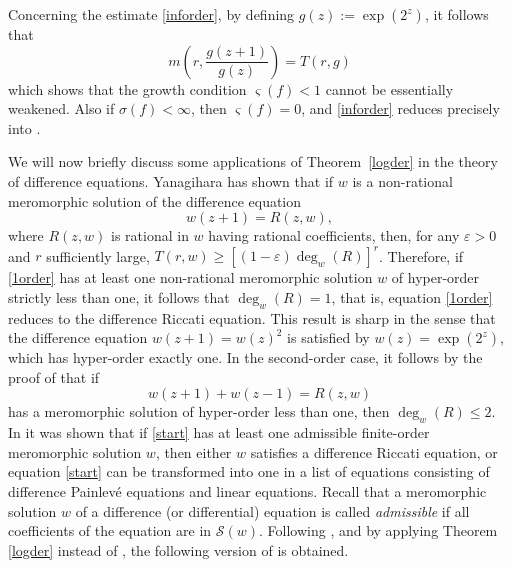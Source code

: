 \documentclass{amsart}
\theoremstyle{definition}
\numberwithin{equation}{section}
\numberwithin{theorem}{section}
\begin{document}
Concerning the estimate \eqref{inforder}, by defining $g(z):=\exp(2^z)$, it follows that
    \begin{equation*}
    m\left(r,\frac{g(z+1)}{g(z)}\right)=T(r,g)
    \end{equation*}
which shows that the growth condition $\varsigma(f)<1$ cannot be
essentially weakened. Also if $\sigma(f)<\infty$, then $\varsigma(f)=0$, and \eqref{inforder} reduces precisely into \cite[Theorem 2.1]{halburdk:06AASFM}.

We will now briefly discuss some applications of Theorem~\ref{logder} in the theory of difference equations. Yanagihara \cite{yanagihara:80} has shown that if $w$ is a non-rational meromorphic solution of the difference equation
    \begin{equation}\label{1order}
    w(z+1) = R(z,w),
    \end{equation}
where $R(z,w)$ is rational in $w$ having rational coefficients,
then, for any $\varepsilon>0$ and $r$ sufficiently large,
$T(r,w)\geq [(1-\varepsilon)\deg_w(R)]^r$. Therefore, if
\eqref{1order} has at least one non-rational meromorphic solution
$w$ of hyper-order strictly less than one, it follows that
$\deg_w(R)=1$, that is, equation \eqref{1order} reduces to the
difference Riccati equation. This result is sharp in the sense
that the difference equation $w(z+1)=w(z)^2$ is satisfied by
$w(z)=\exp(2^z)$, which has hyper-order exactly one. In the
second-order case, it follows by the proof of \cite[Theorem
3]{ablowitzhh:00} that if
    \begin{equation}\label{start}
    w(z+1) + w(z-1) = R(z,w)
    \end{equation}
has a meromorphic solution of hyper-order less than one, then
$\deg_w(R)\leq2$. In \cite{halburdk:07PLMS} it was shown that if
\eqref{start} has at least one admissible finite-order meromorphic
solution $w$, then either $w$ satisfies a difference Riccati
equation, or equation \eqref{start} can be transformed into one in
a list of equations consisting of difference Painlev\'e equations
and linear equations. Recall that a meromorphic solution $w$ of a difference (or differential) equation is called \textit{admissible} if all coefficients of the equation are in $\mathcal{S}(w)$. Following \cite{halburdk:07PLMS}, and by
applying Theorem \ref{logder} instead of \cite[Lemma
2.3]{halburdk:06JMAA}, the following version of \cite[Theorem
1.1]{halburdk:07PLMS} is obtained.
\end{document}
